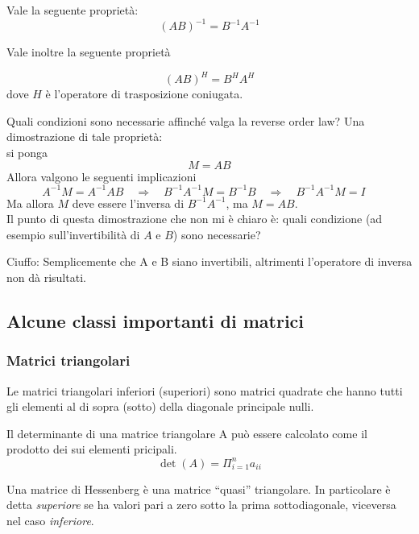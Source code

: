 \begin{property}
Vale la seguente propriet\`a:
$$ (AB)^{-1} = B^{-1} A^{-1}$$
\end{property}

Vale inoltre la seguente propriet\`a
\begin{property}
\begin{equation}\label{eq:eq001}  (AB)^{H} =  B^{H} A^{H}\end{equation}
dove $H$ \`e l'operatore di trasposizione coniugata.
\end{property}

\begin{openquestion}
Quali condizioni sono necessarie affinch\'e valga la reverse order law?
Una dimostrazione di tale proprietà: \\
si ponga 
$$ M = AB$$
Allora valgono le seguenti implicazioni
$$ A^{-1}M = A^{-1}AB \quad \Rightarrow \quad
 B^{-1}A^{-1}M = B^{-1}B  \quad
 \Rightarrow \quad
 B^{-1}A^{-1}M = I \quad 
$$
Ma allora $M$ deve essere l'inversa di $B^{-1}A^{-1}$, ma $M=AB$. \\
Il punto di questa dimostrazione che non mi \`e chiaro \`e:
quali condizione (ad esempio  sull'invertibilità di $A$ e $B$)
sono necessarie?

Ciuffo: Semplicemente che A e B siano invertibili, altrimenti 
l'operatore di inversa non dà risultati.
\end{openquestion}

\subsection{Alcune classi importanti di matrici}
\subsubsection{Matrici triangolari}
\begin{defn}
Le matrici triangolari inferiori (superiori) sono matrici quadrate che
hanno tutti gli elementi al di sopra (sotto) della diagonale
principale nulli.
\end{defn}

Il determinante di una matrice triangolare A può essere calcolato come il
prodotto dei sui elementi pricipali.
$$ \det(A) = \Pi_{i=1}^{n} a_{ii} $$ \label{triangolari}

\begin{defn}
\label{def:hessemberg}
Una matrice di Hessenberg \`e una matrice ``quasi'' triangolare. In
particolare \`e detta \emph{superiore} se ha valori pari a zero sotto la prima
sottodiagonale, viceversa nel caso \emph{inferiore}.
\end{defn}

